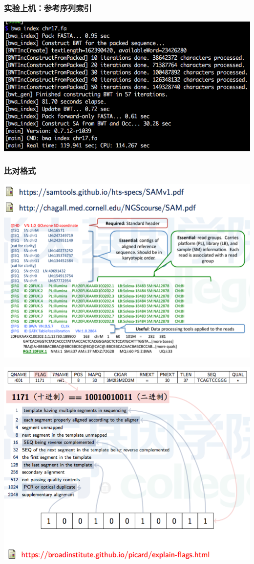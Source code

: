 \documentclass[12pt]{beamer}
\begin{document}
\begin{frame}\frametitle{实验上机：参考序列索引}
  \includegraphics[width=\textwidth]{figures/index_com.png}
\end{frame}

\begin{frame}\frametitle{比对格式}
  \includegraphics[width=\textwidth]{figures/old_slides/sam.png}
\end{frame}

\begin{frame}
  \includegraphics[width=\textwidth]{figures/old_slides/sam-for1.png}
\end{frame}
\end{document}
